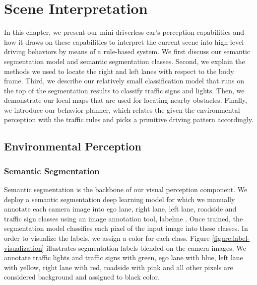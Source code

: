 \chapter{Scene Interpretation}
\label{chp:b4}

In this chapter, we present our mini driverless car's perception capabilities
and how it draws on these capabilities to interpret the current scene into
high-level driving behaviors by means of a rule-based system. We first discuss
our semantic segmentation model and semantic segmentation classes. Second, we
explain the methods we used to locate the right and left lanes with respect to
the body frame. Third, we describe our relatively small classification model
that runs on the top of the segmentation results to classify traffic signs and
lights. Then, we demonstrate our local maps that are used for locating nearby
obstacles. Finally, we introduce our behavior planner, which relates the given
the environmental perception with the traffic rules and picks a primitive
driving pattern accordingly.

\section{Environmental Perception}

\subsection{Semantic Segmentation}

Semantic segmentation is the backbone of our visual perception component. We
deploy a semantic segmentation deep learning model for which we manually
annotate each camera image into ego lane, right lane, left lane, roadside and
traffic sign classes using an image annotation tool, labelme
\cite{Ketaro2016LM}. Once trained, the segmentation model classifies each pixel
of the input image into these classes. In order to visualize the labels, we
assign a color for each class.  Figure \ref{figure:label-visualization}
illustrates segmentation labels blended on the camera images. We annotate
traffic lights and traffic signs with green, ego lane with blue, left lane with
yellow, right lane with red, roadside with pink and all other pixels are
considered background and assigned to black color.


